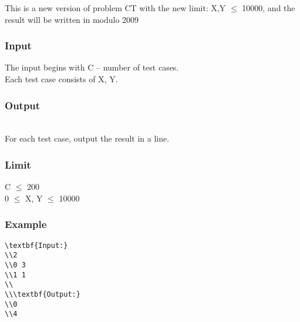 



   This is a new version of problem CT with the new limit: X,Y $\le$ 10000, and the result will be written in modulo 2009  

\subsubsection{   Input  }

   The input begins with C – number of test cases.   
\\   Each test case consists of X, Y.  

\subsubsection{   Output  }


\\   For each test case, output the result in a line.  

\subsubsection{   Limit  }

   C  $\le$  200   
\\   0  $\le$  X, Y  $\le$  10000  

\subsubsection{   Example  }
\begin{verbatim}
\textbf{Input:}
\\2
\\0 3
\\1 1
\\
\\\textbf{Output:}
\\0
\\4\end{verbatim}
